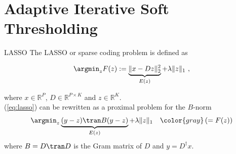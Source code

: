 \documentclass[ignorenonframetext]{beamer}
\def\keypoint#1{\hfill\textcolor{gray}{#1}}
\def\mycite#1{\keypoint{\cite{#1}}}
\begin{document}


\section{Adaptive Iterative Soft Thresholding}
\label{sec:adapt}


\begin{frame}{LASSO \hfill\hfill\hfill\hfill\hfill \mycite{Tibshirani1996}}
	The LASSO or sparse coding problem is defined as
	
	\begin{equation}
        \label{eq:lasso}
        \argmin_z F(z) := \underbrace{\|x - Dz\|_ 2^2}_{E(z)} + \lambda\|z\|_1~,
	\end{equation}
	
	where $x \in \mathbb R^P$, $D \in \mathbb R^{P\times K}$ and $z \in \mathbb R^K$.\\[2em]

	
	(\autoref{eq:lasso}) can be rewritten as a proximal problem for the $B$-norm
	\[
	\argmin_z \underbrace{(y-z)\tran B (y-z) }_{E(z)} + \lambda \|z\|_1
				\hspace{1em}{\color{gray}\left(= F(z)\right)}
	\]
	where $B = D\tran D$ is the Gram matrix of $D$ and $y = D^\dagger x$.\\[.5em]
\end{frame}
\end{document}
